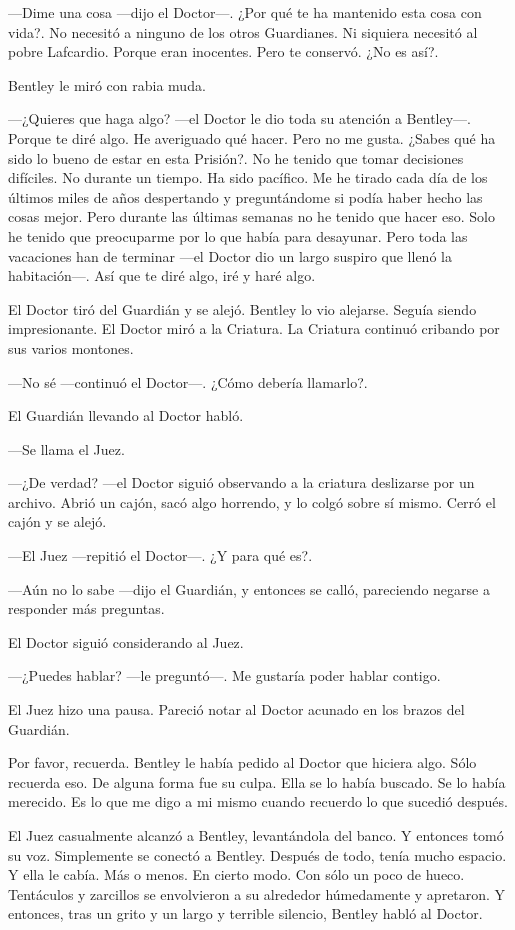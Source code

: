 ---Dime una cosa ---dijo el Doctor---. ¿Por qué te ha mantenido esta
cosa con vida?. No necesitó a ninguno de los otros Guardianes. Ni
siquiera necesitó al pobre Lafcardio. Porque eran inocentes. Pero te
conservó. ¿No es así?.

Bentley le miró con rabia muda.

---¿Quieres que haga algo? ---el Doctor le dio toda su atención a
Bentley---. Porque te diré algo. He averiguado qué hacer. Pero no me
gusta. ¿Sabes qué ha sido lo bueno de estar en esta Prisión?. No he
tenido que tomar decisiones difíciles. No durante un tiempo. Ha sido
pacífico. Me he tirado cada día de los últimos miles de años despertando
y preguntándome si podía haber hecho las cosas mejor. Pero durante las
últimas semanas no he tenido que hacer eso. Solo he tenido que
preocuparme por lo que había para desayunar. Pero toda las vacaciones
han de terminar ---el Doctor dio un largo suspiro que llenó la
habitación---. Así que te diré algo, iré y haré algo.

El Doctor tiró del Guardián y se alejó. Bentley lo vio alejarse. Seguía
siendo impresionante. El Doctor miró a la Criatura. La Criatura continuó
cribando por sus varios montones.

---No sé ---continuó el Doctor---. ¿Cómo debería llamarlo?.

El Guardián llevando al Doctor habló.

---Se llama el Juez.

---¿De verdad? ---el Doctor siguió observando a la criatura deslizarse
por un archivo. Abrió un cajón, sacó algo horrendo, y lo colgó sobre sí
mismo. Cerró el cajón y se alejó.

---El Juez ---repitió el Doctor---. ¿Y para qué es?.

---Aún no lo sabe ---dijo el Guardián, y entonces se calló, pareciendo
negarse a responder más preguntas.

El Doctor siguió considerando al Juez.

---¿Puedes hablar? ---le preguntó---. Me gustaría poder hablar contigo.

El Juez hizo una pausa. Pareció notar al Doctor acunado en los brazos
del Guardián.

Por favor, recuerda. Bentley le había pedido al Doctor que hiciera algo.
Sólo recuerda eso. De alguna forma fue su culpa. Ella se lo había
buscado. Se lo había merecido. Es lo que me digo a mi mismo cuando
recuerdo lo que sucedió después.

El Juez casualmente alcanzó a Bentley, levantándola del banco. Y
entonces tomó su voz. Simplemente se conectó a Bentley. Después de todo,
tenía mucho espacio. Y ella le cabía. Más o menos. En cierto modo. Con
sólo un poco de hueco. Tentáculos y zarcillos se envolvieron a su
alrededor húmedamente y apretaron. Y entonces, tras un grito y un largo
y terrible silencio, Bentley habló al Doctor.

